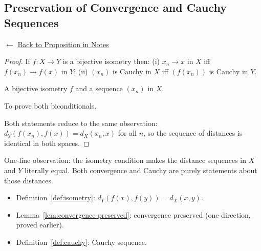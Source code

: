 
\subsection*{Preservation of Convergence and Cauchy Sequences}
\label{prf:isometry-preserves-convergence}

\begin{remark*}[Return]
$\leftarrow$ \hyperref[prop:isometry-preserves-convergence]{Back to Proposition in Notes}
\end{remark*}

\begin{proof}
\Claim If $f : X \to Y$ is a bijective isometry then:
(i) $x_n \to x$ in $X$ iff $f(x_n) \to f(x)$ in $Y$;
(ii) $(x_n)$ is Cauchy in $X$ iff $(f(x_n))$ is Cauchy in $Y$.

\Given A bijective isometry $f$ and a sequence $(x_n)$ in $X$.

\Goal To prove both biconditionals.

\Strategy Both statements reduce to the same observation:
$d_Y(f(x_n),f(x)) = d_X(x_n,x)$ for all $n$,
so the sequence of distances is identical in both spaces.


\end{proof}

\begin{remark*}
One-line observation: the isometry condition makes the distance sequences
in $X$ and $Y$ literally equal. Both convergence and Cauchy are purely
statements about those distances.
\end{remark*}

\begin{remark*}[Dependencies]
\begin{itemize}
  \item Definition~\ref{def:isometry}: $d_Y(f(x),f(y)) = d_X(x,y)$.
  \item Lemma~\ref{lem:convergence-preserved}: convergence preserved (one direction,
        proved earlier).
  \item Definition~\ref{def:cauchy}: Cauchy sequence.
\end{itemize}
\end{remark*}
